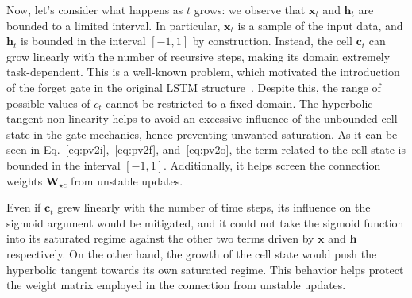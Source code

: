 %
Now, let's consider what happens as $t$ grows: we observe that $\mathbf{x}_t$ and $\mathbf{h}_t$ are bounded to a limited interval. In particular, $\mathbf{x}_t$ is a sample of the input data, and $\mathbf{h}_t$ is bounded in the interval $[-1, 1]$ by construction. Instead, the cell $\mathbf{c}_t$ can grow linearly with the number of recursive steps, making its domain extremely task-dependent.
%
This is a well-known problem, which motivated the introduction of the forget gate in the original LSTM structure~\citep{gers2000forget}. Despite this, the range of possible values of $c_t$ cannot be restricted to a fixed domain.
%
The hyperbolic tangent non-linearity helps to avoid an excessive influence of the unbounded cell state in the gate mechanics, hence preventing unwanted saturation. As it can be seen in Eq.~\ref{eq:pv2i},~\ref{eq:pv2f}, and~\ref{eq:pv2o}, the term related to the cell state is bounded in the interval $[-1, 1]$. Additionally, it helps screen the connection weights $\mathbf{W}_{\star c}$ from unstable updates.

Even if $\mathbf{c}_t$ grew linearly with the number of time steps, its influence on the sigmoid argument would be mitigated, and it could not take the sigmoid function into its saturated regime against the other two terms driven by $\mathbf{x}$ and $\mathbf{h}$ respectively.
On the other hand, the growth of the cell state would push the hyperbolic tangent towards its own saturated regime. This behavior helps protect the weight matrix employed in the connection from unstable updates.

